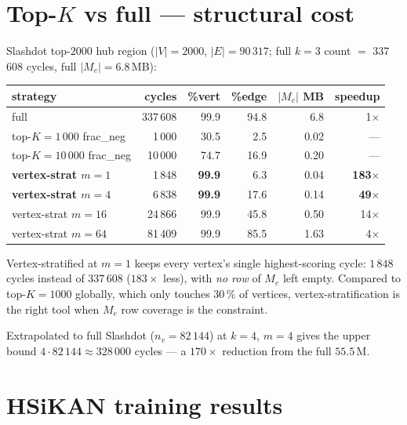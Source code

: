 \documentclass[11pt,a4paper]{article}
\begin{document}
\section{Top-$K$ vs full --- structural cost}

Slashdot top-$2000$ hub region ($|V|{=}2000$, $|E|{=}90\,317$;
full $k{=}3$ count $=$ 337\,608 cycles, full $|M_e|{=}6.8$\,MB):

\begin{center}
\begin{tabular}{lrrrrr}
\toprule
strategy                        & cycles  & \%vert & \%edge & $|M_e|$ MB & speedup \\
\midrule
full                            & 337\,608 & 99.9   & 94.8   & 6.8        & 1$\times$ \\
top-$K=1\,000$ frac\_neg        &   1\,000 & 30.5   &  2.5   & 0.02       & — \\
top-$K=10\,000$ frac\_neg       &  10\,000 & 74.7   & 16.9   & 0.20       & — \\
\midrule
\textbf{vertex-strat $m{=}1$}   &   1\,848 & \textbf{99.9} &  6.3 & 0.04 & \textbf{183$\times$} \\
\textbf{vertex-strat $m{=}4$}   &   6\,838 & \textbf{99.9} & 17.6 & 0.14 & \textbf{49$\times$} \\
vertex-strat $m{=}16$           &  24\,866 & 99.9   & 45.8 & 0.50      & 14$\times$ \\
vertex-strat $m{=}64$           &  81\,409 & 99.9   & 85.5 & 1.63      & 4$\times$ \\
\bottomrule
\end{tabular}
\end{center}

Vertex-stratified at $m=1$ keeps every vertex's single highest-scoring
cycle: $1\,848$ cycles instead of $337\,608$ ($183\times$ less), with
\emph{no row} of $M_e$ left empty. Compared to top-$K=1000$ globally,
which only touches 30\,\% of vertices, vertex-stratification is the
right tool when $M_e$ row coverage is the constraint.

Extrapolated to full Slashdot ($n_v = 82\,144$) at $k=4$, $m=4$ gives
the upper bound $4 \cdot 82\,144 \approx 328\,000$ cycles --- a
$170\times$ reduction from the full $55.5$\,M.

\section{HSiKAN training results}
\end{document}
